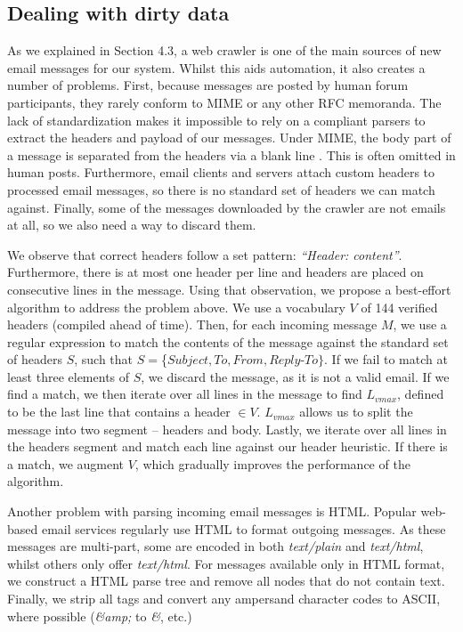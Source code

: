 \subsection{Dealing with dirty data}
As we explained in Section 4.3, a web crawler is one of the main sources of new email messages for our system. Whilst this aids automation, it also creates a number of problems. First, because messages are posted by human forum participants, they rarely conform to MIME or any other RFC memoranda. The lack of standardization makes it impossible to rely on a compliant parsers to extract the headers and payload of our messages. Under MIME, the body part of a message is separated from the headers via a blank line \cite{P14}. This is often omitted in human posts. Furthermore, email clients and servers attach custom headers to processed email messages, so there is no standard set of headers we can match against. Finally, some of the messages downloaded by the crawler are not emails at all, so we also need a way to discard them.

We observe that correct headers follow a set pattern: \textit{``Header: content''}. Furthermore, there is at most one header per line and headers are placed on consecutive lines in the message. Using that observation, we propose a best-effort algorithm to address the problem above. We use a vocabulary $V$ of 144 verified headers (compiled ahead of time). Then, for each incoming message $M$, we use a regular expression to match the contents of the message against the standard set of headers $S$, such that $S = $\{$Subject, To, From, Reply$-$To\}$. If we fail to match at least three elements of $S$, we discard the message, as it is not a valid email. If we find a match, we then iterate over all lines in the message to find $L_{vmax}$, defined to be the last line that contains a header $\in V$. $L_{vmax}$ allows us to split the message into two segment -- headers and body. Lastly, we iterate over all lines in the headers segment and match each line against our header heuristic. If there is a match, we augment $V$, which gradually improves the performance of the algorithm.

Another problem with parsing incoming email messages is HTML. Popular web-based email services regularly use HTML to format outgoing messages. As these messages are multi-part, some are encoded in both \emph{text/plain} and \emph{text/html}, whilst others only offer \emph{text/html}. For messages available only in HTML format, we construct a HTML parse tree and remove all nodes that do not contain text. Finally, we strip all tags and convert any ampersand character codes to ASCII, where possible (\emph{\&amp;} to \emph{\&}, etc.)

